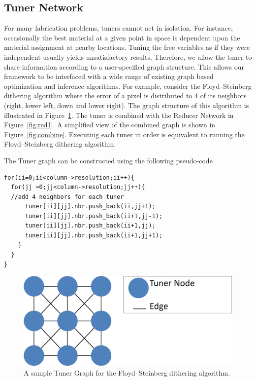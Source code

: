 \documentclass[annual]{acmsiggraph}
\begin{document}
\subsection{Tuner Network}
For many fabrication problems, tuners cannot act in isolation. For instance,  occasionally the best material at a given point in space is dependent upon the material assignment at nearby locations.  Tuning the free variables as if they were independent usually yields unsatisfactory results. Therefore, we allow the tuner to share information according to a user-specified graph structure.  This allows our framework to be interfaced with a wide range of existing graph based optimization and inference algorithms. For example, consider the Floyd–Steinberg dithering algorithm where the error of a pixel is distributed
to $4$ of its neighbors (right, lower left, down and lower right).  The graph structure of this algorithm is illustrated in Figure~\ref{fig:tuner}. The tuner is combined with the Reducer Network in Figure~\ref{fig:red1}. A simplified view of the combined graph is shown in Figure~\ref{fig:combine}. Executing each tuner in order is equivalent to running the Floyd–Steinberg dithering algorithm.

The Tuner graph can be constructed using the following pseudo-code
\begin{verbatim}
for(ii=0;ii<column->resolution;ii++){
  for(jj =0;jj<column->resolution;jj++){
  //add 4 neighbors for each tuner
      tuner[ii][jj].nbr.push_back(ii,jj+1);
      tuner[ii][jj].nbr.push_back(ii+1,jj-1);
      tuner[ii][jj].nbr.push_back(ii+1,jj);
      tuner[ii][jj].nbr.push_back(ii+1,jj+1);    
    }
  }
}
\end{verbatim}

\begin{figure}[h]
\includegraphics[scale=0.3]{figure/tuner.pdf}
\caption{A sample Tuner Graph for the Floyd–Steinberg dithering algorithm.}
\label{fig:tuner}
\end{figure}
\end{document}
